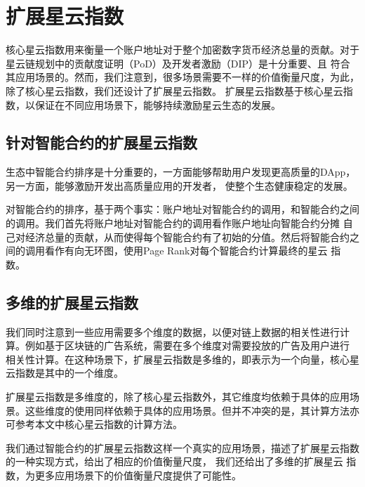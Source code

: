 \section{扩展星云指数}
核心星云指数用来衡量一个账户地址对于整个加密数字货币经济总量的贡献。对于星云链规划中的贡献度证明（PoD）及开发者激励（DIP）是十分重要、且
符合其应用场景的。然而，我们注意到，很多场景需要不一样的价值衡量尺度，为此，除了核心星云指数，我们还设计了扩展星云指数。
扩展星云指数基于核心星云指数，以保证在不同应用场景下，能够持续激励星云生态的发展。

\subsection{针对智能合约的扩展星云指数}
生态中智能合约排序是十分重要的，一方面能够帮助用户发现更高质量的DApp，另一方面，能够激励开发出高质量应用的开发者，
使整个生态健康稳定的发展。

对智能合约的排序，基于两个事实：账户地址对智能合约的调用，和智能合约之间的调用。我们首先将账户地址对智能合约的调用看作账户地址向智能合约分摊
自己对经济总量的贡献，从而使得每个智能合约有了初始的分值。然后将智能合约之间的调用看作有向无环图，使用Page Rank对每个智能合约计算最终的星云
指数。


\subsection{多维的扩展星云指数}
我们同时注意到一些应用需要多个维度的数据，以便对链上数据的相关性进行计算。例如基于区块链的广告系统，需要在多个维度对需要投放的广告及用户进行
相关性计算。在这种场景下，扩展星云指数是多维的，即表示为一个向量，核心星云指数是其中的一个维度。

扩展星云指数是多维度的，除了核心星云指数外，其它维度均依赖于具体的应用场景。这些维度的使用同样依赖于具体的应用场景。但并不冲突的是，其计算方法亦可参考本文中核心星云指数的计算方法。

\vspace{2em}

我们通过智能合约的扩展星云指数这样一个真实的应用场景，描述了扩展星云指数的一种实现方式，给出了相应的价值衡量尺度，
我们还给出了多维的扩展星云
指数，为更多应用场景下的价值衡量尺度提供了可能性。
